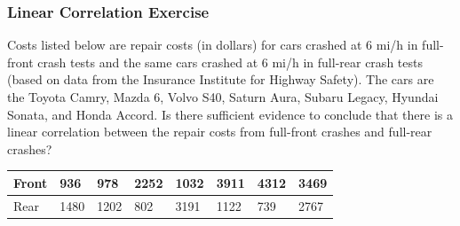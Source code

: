 \documentclass[xcolor=dvipsnames]{beamer}
\begin{document}
\begin{frame}
  \frametitle{Linear Correlation Exercise}
Costs listed below are repair costs (in dollars) for cars crashed
at 6 mi/h in full-front crash tests and the same cars crashed at 6
mi/h in full-rear crash tests (based on data from the Insurance
Institute for Highway Safety). The cars are the Toyota Camry,
Mazda 6, Volvo S40, Saturn Aura, Subaru Legacy, Hyundai Sonata,
and Honda Accord. Is there sufficient evidence to conclude that
there is a linear correlation between the repair costs from
full-front crashes and full-rear crashes?

\bigskip

\begin{tabular}{|l|l|l|l|l|l|l|l|}
\hline
Front & 936 & 978 & 2252 & 1032 & 3911 & 4312 & 3469 \\
\hline
Rear & 1480 & 1202 & 802 & 3191 & 1122 & 739 & 2767 \\
\hline
\end{tabular}

\end{frame}
\end{document}
